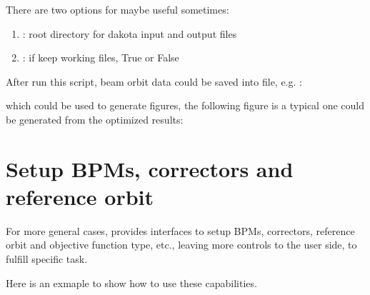 \documentclass[letterpaper,10pt,english]{sphinxmanual}
\let\sphinxpxdimen\pdfpxdimen\else\newdimen\sphinxpxdimen
\begin{document}
There are two options for  maybe useful sometimes:
\begin{enumerate}
\item {} 
: root directory for dakota input and output files

\item {} 
: if keep working files, True or False

\end{enumerate}

After run this script, beam orbit data could be saved into file, e.g.
:

which could be used to generate figures, the following figure is a typical
one could be generated from the optimized results:

\noindent{\hspace*{\fill}\sphinxincludegraphics[width=500\sphinxpxdimen]{{oc_x0y0}.png}\hspace*{\fill}}


\section{Setup BPMs, correctors and reference orbit}
\label{\detokenize{src/demos/demo2:setup-bpms-correctors-and-reference-orbit}}\label{\detokenize{src/demos/demo2::doc}}
For more general cases,  provides interfaces to setup
BPMs, correctors, reference orbit and objective function type, etc.,
leaving more controls to the user side, to fulfill specific task.

Here is an exmaple to show how to use these capabilities.
\end{document}
